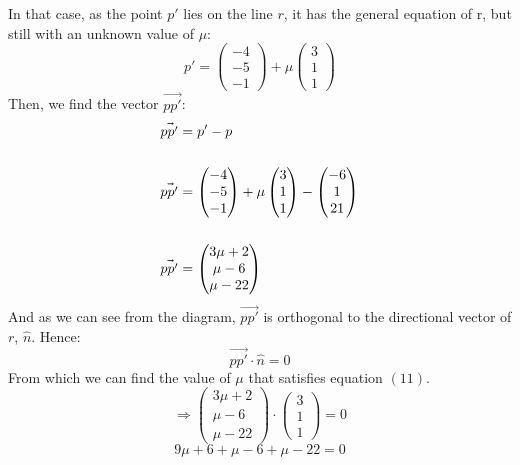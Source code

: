 \documentclass[hidelinks, a4paper, 12pt]{article}
\newcommand{\thus}{\Rightarrow}
\newcommand{\nhat}{\hat{n}}
\newcommand{\n}{\\[\baselineskip]}
\begin{document}
                In that case, as the point $p'$ lies on the line $r$, it has the general equation of r, but still with an unknown value of $\mu$:
                \[p' = \begin{pmatrix} -4\\-5\\-1 \end{pmatrix} + \mu\begin{pmatrix} 3\\1\\1 \end{pmatrix}\] 
                Then, we find the vector $\vec{pp'}$:
                \[\begin{split}
                    \vec{pp'} &= p' - p \n
                    \vec{pp'} &= \begin{pmatrix} -4\\-5\\-1 \end{pmatrix} + \mu\begin{pmatrix} 3\\1\\1 \end{pmatrix} - \begin{pmatrix} -6\\1\\21 \end{pmatrix}\n 
                    \vec{pp'} &= \begin{pmatrix} 3\mu + 2 \\ \mu - 6\\ \mu -22\end{pmatrix}                       
                \end{split}\]
                And as we can see from the diagram, $\vec{pp'}$ is orthogonal to the directional vector of $r$, $\nhat$. Hence:
                \begin{equation}\vec{pp'}\cdot \nhat = 0\end{equation}
                From which we can find the value of $\mu$ that satisfies equation $(11)$.
                \[\thus\begin{pmatrix} 3\mu + 2 \\ \mu - 6\\ \mu -22\end{pmatrix} \cdot \begin{pmatrix} 3\\1\\1 \end{pmatrix} = 0\]
                \[9\mu + 6 + \mu - 6 + \mu - 22 = 0\]
\end{document}
